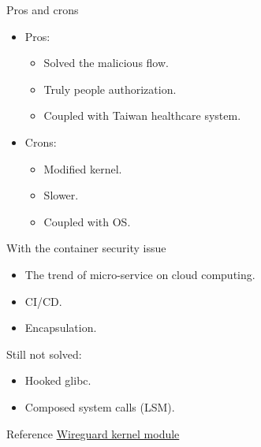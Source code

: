 \documentclass{beamer}
\begin{document}
\begin{CJK*}{UTF8}{bsmi}
  \begin{frame}{Pros and crons}
    \begin{itemize}
      \item Pros:
            \begin{itemize}
              \item Solved the malicious flow.
              \item Truly people authorization.
              \item Coupled with Taiwan healthcare system.
            \end{itemize}
      \item Crons:
            \begin{itemize}
              \item Modified kernel.
              \item Slower.
              \item Coupled with OS.
            \end{itemize}
    \end{itemize}
  \end{frame}

  \begin{frame}{With the container security issue}
    \begin{itemize}
      \item The trend of micro-service on cloud computing.
      \item CI/CD.
      \item Encapsulation.
    \end{itemize}
    Still not solved:
    \begin{itemize}
      \item Hooked glibc.
      \item Composed system calls (LSM).
    \end{itemize}
  \end{frame}

  \begin{frame}{Reference}
    \href{https://wiki.gentoo.org/wiki/Wireguard}{Wireguard kernel module}
  \end{frame}

\end{CJK*}
\end{document}
